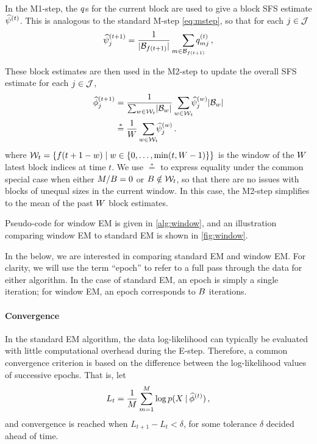 In the M1-step, the $\post$s for the current block are used to give a block SFS estimate $\bsfs[t]$.
This is analogous to the standard M-step \cref{eq:mstep}, so that for each $j \in \mathcal{J}$
%
\begin{equation}\label{eq:windowm1step}
    \bsfs[t + 1]_j 
    = 
    \frac{1}{\size{\blockset[f(t + 1)]}} 
        \smashoperator[r]{\sum_{m \in \blockset[f(t + 1)]}}
        \post[t]_{mj}
    \, ,
\end{equation}
%

These block estimates are then used in the M2-step to update the overall SFS estimate for each $j \in \mathcal{J}$,
%
\begin{align}\label{eq:windowm2step}
    \estsfs[t + 1]_j
    &=
    \frac{1}{
        \sum_{w \in \windowset[t]}
            \size{\blockset[w]}
    }
    \smashoperator[r]{\sum_{w \in \windowset[t]}}
        \bsfs[w]_j \size{\blockset[w]} \nonumber \\
    &\stackrel{*}{=}
    \frac{1}{W} 
    \smashoperator[r]{\sum_{w \in \windowset[t]}}
        \bsfs[w]_j
    \, .
\end{align}
%
where $\windowset[t] = \set{f(t + 1 - w) \mid w \in \set{0, \dots, \min(t, \windows - 1)}}$ is the window of the $W$ latest block indices at time $t$.
We use $\stackrel{*}{=}$ to express equality under the common special case when either $M / B = 0$ or $\blocks \notin \windowset[t]$, so that there are no issues with blocks of unequal sizes in the current window.
In this case, the M2-step simplifies to the mean of the past $W$ block estimates.

Pseudo-code for window EM is given in \cref{alg:window}, and an illustration comparing window EM to standard EM is shown in \cref{fig:window}.

In the below, we are interested in comparing standard EM and window EM.
For clarity, we will use the term \enquote{epoch} to refer to a full pass through the data for either algorithm.
In the case of standard EM, an epoch is simply a single iteration; for window EM, an epoch corresponds to $B$ iterations.

\paragraph{Convergence}

In the standard EM algorithm, the data log-likelihood  can typically be evaluated with little computational overhead during the E-step.
Therefore, a common convergence criterion is based on the difference between the log-likelihood values of successive epochs.
That is, let
%
\begin{equation}
    L_{t} = \frac{1}{M} \sum_{m = 1}^M \log \prob(\data \given \estsfs[t])
    \, ,
\end{equation}
%
and convergence is reached when $L_{t + 1} - L_t < \delta$, for some tolerance $\delta$ decided ahead of time.

